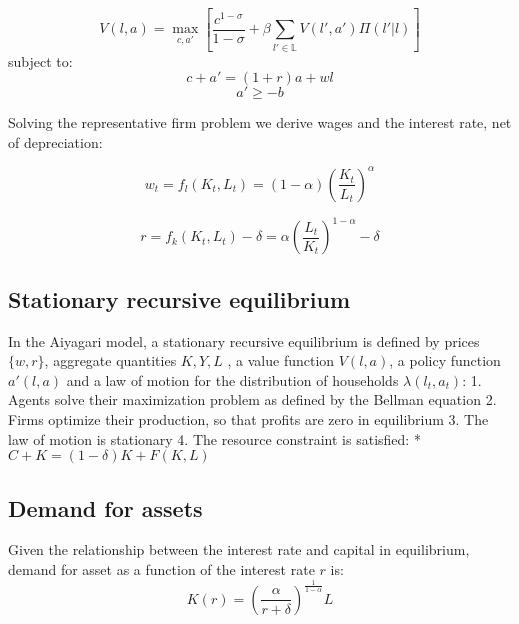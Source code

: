 \documentclass[11pt]{article}
\begin{document}
\[
V(l,a) = \max_{c,a'} \left[ \frac{c^{1- \sigma}}{1-\sigma} + \beta \sum_{l' \in \mathbb{L}}  V(l',a') \Pi(l' | l) \right]
\] subject to: \[
 c + a' = (1+r) a + w l
\] \[
a'\geq - b
\]

    Solving the representative firm problem we derive wages and the interest
rate, net of depreciation:

\[
w_t = f_l(K_t,L_t) = (1 - \alpha) \left(\frac{K_t}{L_t}\right)^\alpha
\]

\[
r = f_k(K_t,L_t) - \delta = \alpha \left(\frac{L_t}{K_t}\right)^{1 - \alpha} - \delta
\]

    \hypertarget{stationary-recursive-equilibrium}{%
\subsection{Stationary recursive
equilibrium}\label{stationary-recursive-equilibrium}}

    In the Aiyagari model, a stationary recursive equilibrium is defined by
prices \(\{w, r\}\), aggregate quantities \(K, Y, L\) , a value function
\(V(l,a)\), a policy function \(a'(l,a)\) and a law of motion for the
distribution of households \(\lambda(l_t, a_t)\): 1. Agents solve their
maximization problem as defined by the Bellman equation 2. Firms
optimize their production, so that profits are zero in equilibrium 3.
The law of motion is stationary 4. The resource constraint is satisfied:
* \(C + K = (1- \delta) K + F(K,L)\)

    \hypertarget{demand-for-assets}{%
\subsection{Demand for assets}\label{demand-for-assets}}

Given the relationship between the interest rate and capital in
equilibrium, demand for asset as a function of the interest rate \(r\)
is: \[
K(r) = \left(\frac{\alpha}{r + \delta}\right)^{\frac{1}{1-\alpha}} L
\]
\end{document}
